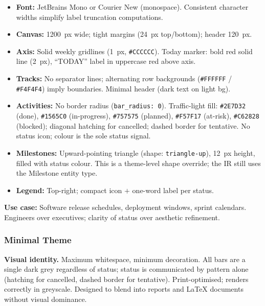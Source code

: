 \begin{itemize}
  \item \textbf{Font:} JetBrains Mono or Courier New (monospace). Consistent character
        widths simplify label truncation computations.
  \item \textbf{Canvas:} 1200~px wide; tight margins (24~px top/bottom); header 120~px.
  \item \textbf{Axis:} Solid weekly gridlines (1~px, \texttt{\#CCCCCC}). Today marker:
        bold red solid line (2~px), ``TODAY'' label in uppercase red above axis.
  \item \textbf{Tracks:} No separator lines; alternating row backgrounds (\texttt{\#FFFFFF}
        / \texttt{\#F4F4F4}) imply boundaries. Minimal header (dark text on light bg).
  \item \textbf{Activities:} No border radius (\texttt{bar\_radius: 0}). Traffic-light fill:
        \texttt{\#2E7D32} (done), \texttt{\#1565C0} (in-progress), \texttt{\#757575}
        (planned), \texttt{\#F57F17} (at-risk), \texttt{\#C62828} (blocked); diagonal
        hatching for cancelled; dashed border for tentative. No status icon; colour is
        the sole status signal.
  \item \textbf{Milestones:} Upward-pointing triangle (shape: \texttt{triangle-up}),
        12~px height, filled with status colour. This is a theme-level shape override;
        the IR still uses the Milestone entity type.
  \item \textbf{Legend:} Top-right; compact icon $+$ one-word label per status.
\end{itemize}

\textbf{Use case:} Software release schedules, deployment windows, sprint calendars.
Engineers over executives; clarity of status over aesthetic refinement.

\subsubsection{Minimal Theme}
\label{sec:theme-minimal}

\textbf{Visual identity.}
Maximum whitespace, minimum decoration. All bars are a single dark grey regardless of status;
status is communicated by pattern alone (hatching for cancelled, dashed border for tentative).
Print-optimised; renders correctly in greyscale. Designed to blend into reports and LaTeX
documents without visual dominance.

